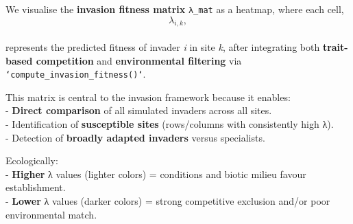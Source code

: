 \documentclass[
]{article}
\begin{document}
We visualise the \textbf{invasion fitness matrix} \texttt{λ\_mat} as a
heatmap, where each cell,\\
\[
\lambda_{i,k},
\]\\
represents the predicted fitness of invader \emph{i} in site \emph{k},
after integrating both \textbf{trait-based competition} and
\textbf{environmental filtering} via
\texttt{`compute_invasion_fitness()`}.

This matrix is central to the invasion framework because it enables:\\
- \textbf{Direct comparison} of all simulated invaders across all
sites.\\
- Identification of \textbf{susceptible sites} (rows/columns with
consistently high λ).\\
- Detection of \textbf{broadly adapted invaders} versus specialists.

Ecologically:\\
- \textbf{Higher} λ values (lighter colors) = conditions and biotic
milieu favour establishment.\\
- \textbf{Lower} λ values (darker colors) = strong competitive exclusion
and/or poor environmental match.
\end{document}
